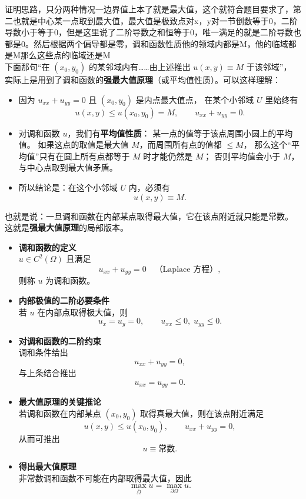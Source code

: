 \begin{dxtips}
    证明思路，只分两种情况一边界值上本了就是最大值，这个就符合题目要求了，第二也就是中心某一点取到最大值，最大值是极致点对x，y对一节倒数等于0，二阶导数小于等于0，但是这里说了二阶导数之和恒等于0，唯一满足的就是二阶导数也都是0。然后根据两个偏导都是零，调和函数性质他的领域内都是M，他的临域都是M那么这些点的临域还是M\\
    下面那句“在 $(x_0,y_0)$ 的某邻域内有……由上述推出 $u(x,y)\equiv M$ 于该邻域”，
实际上是用到了调和函数的\textbf{强最大值原理}（或平均值性质）。可以这样理解：

\begin{itemize}
  \item 因为 $u_{xx}+u_{yy}=0$ 且 $(x_0,y_0)$ 是内点最大值点，
  在某个小邻域 $U$ 里始终有
  \[
    u(x,y)\le u(x_0,y_0)=M,\qquad u_{xx}+u_{yy}=0.
  \]

  \item 对调和函数 $u$，我们有\textbf{平均值性质}：
  某一点的值等于该点周围小圆上的平均值。
  如果这点的取值是最大值 $M$，而周围所有点的值都 $\le M$，
  那么这个“平均值”只有在圆上所有点都等于 $M$ 时才能仍然是 $M$；
  否则平均值会小于 $M$，与中心点取到最大值矛盾。

  \item 所以结论是：在这个小邻域 $U$ 内，必须有
  \[
    u(x,y)\equiv M.
  \]
\end{itemize}

也就是说：一旦调和函数在内部某点取得最大值，它在该点附近就只能是常数。
这就是\textbf{强最大值原理}的局部版本。
\end{dxtips}
\begin{dxtips}
    \begin{itemize}
  \item \textbf{调和函数的定义}\\
  $u\in C^2(\Omega)$ 且满足
  \[
    u_{xx}+u_{yy}=0 \quad\text{（Laplace 方程）},
  \]
  则称 $u$ 为调和函数。

  \item \textbf{内部极值的二阶必要条件}\\
  若 $u$ 在内部点取得极大值，则
  \[
    u_x=u_y=0,\qquad 
    u_{xx}\le 0,\; u_{yy}\le 0.
  \]

  \item \textbf{对调和函数的二阶约束}\\
  调和条件给出
  \[
    u_{xx}+u_{yy}=0,
  \]
  与上条结合推出
  \[
    u_{xx}=u_{yy}=0.
  \]

  \item \textbf{最大值原理的关键推论}\\
  若调和函数在内部某点 $(x_0,y_0)$ 取得真最大值，则在该点附近满足
  \[
    u(x,y)\le u(x_0,y_0),\qquad
    u_{xx}+u_{yy}=0,
  \]
  从而可推出
  \[
    u\equiv \text{常数}.
  \]

  \item \textbf{得出最大值原理}\\
  非常数调和函数不可能在内部取得最大值，因此
  \[
    \max_{\overline\Omega} u = \max_{\partial\Omega} u.
  \]
\end{itemize}
\end{dxtips}
